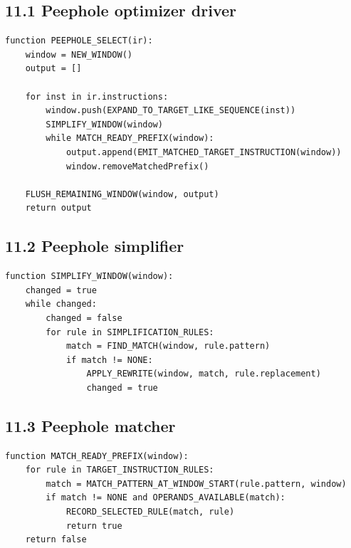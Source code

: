 \documentclass[10pt,letterpaper]{article}
\begin{document}
\subsection*{11.1 Peephole optimizer driver}
{}

\begin{verbatim}
function PEEPHOLE_SELECT(ir):
    window = NEW_WINDOW()
    output = []

    for inst in ir.instructions:
        window.push(EXPAND_TO_TARGET_LIKE_SEQUENCE(inst))
        SIMPLIFY_WINDOW(window)
        while MATCH_READY_PREFIX(window):
            output.append(EMIT_MATCHED_TARGET_INSTRUCTION(window))
            window.removeMatchedPrefix()

    FLUSH_REMAINING_WINDOW(window, output)
    return output
\end{verbatim}

\subsection*{11.2 Peephole simplifier}
{}

\begin{verbatim}
function SIMPLIFY_WINDOW(window):
    changed = true
    while changed:
        changed = false
        for rule in SIMPLIFICATION_RULES:
            match = FIND_MATCH(window, rule.pattern)
            if match != NONE:
                APPLY_REWRITE(window, match, rule.replacement)
                changed = true
\end{verbatim}

\subsection*{11.3 Peephole matcher}
{}

\begin{verbatim}
function MATCH_READY_PREFIX(window):
    for rule in TARGET_INSTRUCTION_RULES:
        match = MATCH_PATTERN_AT_WINDOW_START(rule.pattern, window)
        if match != NONE and OPERANDS_AVAILABLE(match):
            RECORD_SELECTED_RULE(match, rule)
            return true
    return false
\end{verbatim}

\end{document}
